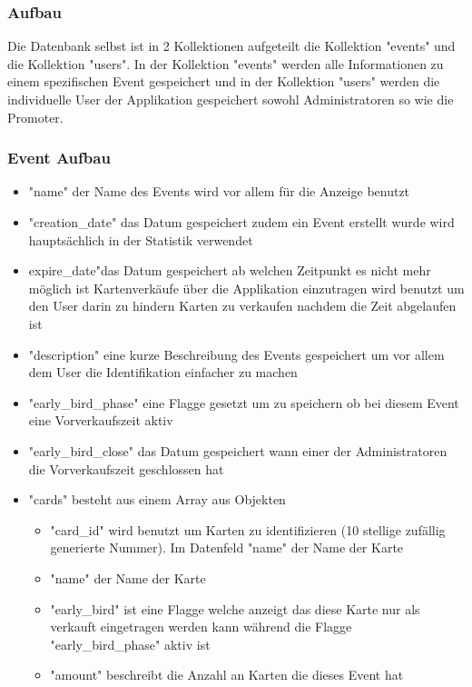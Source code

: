 \documentclass[12pt, letterpaper, twoside]{article}
\begin{document}
		\newpage
		
		\subsubsection{Aufbau}
			Die Datenbank selbst ist in 2 Kollektionen aufgeteilt die Kollektion "events" und die Kollektion "users". In der Kollektion "events" werden alle Informationen zu einem spezifischen Event gespeichert und in der Kollektion "users" werden die individuelle User der Applikation gespeichert sowohl Administratoren so wie die Promoter. 

			\subsubsection{Event Aufbau}			
				\begin{itemize}
					\item "name" der Name des Events wird vor allem für die Anzeige benutzt
					\item "creation\_date" das Datum gespeichert zudem ein Event erstellt wurde wird hauptsächlich in der Statistik verwendet
					\item expire\_date"das Datum gespeichert ab welchen Zeitpunkt es nicht mehr möglich ist Kartenverkäufe über die Applikation einzutragen wird benutzt um den User darin zu hindern Karten zu verkaufen nachdem die Zeit abgelaufen ist
					\item "description" eine kurze Beschreibung des Events gespeichert um vor allem dem User die Identifikation einfacher zu machen
					\item "early\_bird\_phase" eine Flagge gesetzt um zu speichern ob bei diesem Event eine Vorverkaufszeit aktiv
					\item "early\_bird\_close" das Datum gespeichert wann einer der Administratoren die Vorverkaufszeit geschlossen hat
					\item "cards" besteht aus einem Array aus Objekten
					\begin{itemize}
						\item "card\_id" wird benutzt um Karten zu identifizieren (10 stellige zufällig generierte Nummer). 
						Im Datenfeld "name" der Name der Karte
						\item "name" der Name der Karte
						\item "early\_bird" ist eine Flagge welche anzeigt das diese Karte nur als verkauft eingetragen werden kann während die Flagge "early\_bird\_phase" aktiv ist
						\item "amount" beschreibt die Anzahl an Karten die dieses Event hat

\end{itemize}
\end{itemize}
\end{document}
